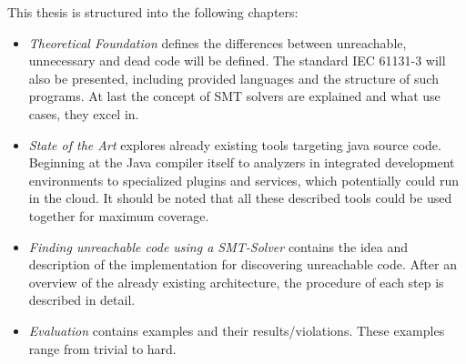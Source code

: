 This thesis is structured into the following chapters:
\begin{itemize}
	\item \emph{Theoretical Foundation} defines the differences between unreachable, unnecessary and dead code will be defined. The standard IEC 61131-3 will also be presented, including provided languages and the structure of such programs. At last the concept of SMT solvers are explained and what use cases, they excel in.
	\item \emph{State of the Art} explores already existing tools targeting java source code. Beginning at the Java compiler itself to analyzers in integrated development environments to specialized plugins and services, which potentially could run in the cloud. It should be noted that all these described tools could be used together for maximum coverage.
	\item \emph{Finding unreachable code using a SMT-Solver} contains the idea and description of the implementation for discovering unreachable code. After an overview of the already existing architecture, the procedure of each step is described in detail.
	\item \emph{Evaluation} contains examples and their results/violations. These examples range from trivial to hard.
\end{itemize}
